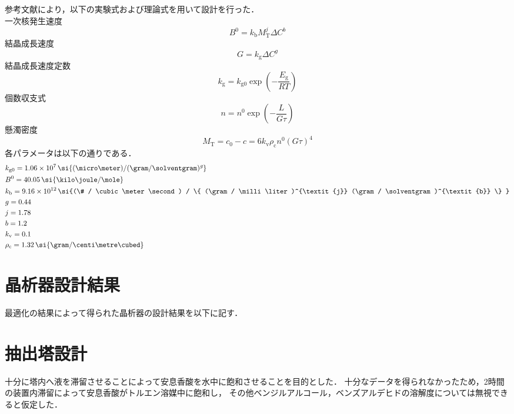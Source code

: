 参考文献\cite{晶析}により，以下の実験式および理論式を用いて設計を行った．\\
一次核発生速度
\begin{equation}
    B^0 = k_\mathrm{b} M_\mathrm{T}^j \Delta C^b
\end{equation}
結晶成長速度
\begin{equation}
    G = k_\mathrm{g}\Delta C^g
\end{equation}
結晶成長速度定数
\begin{equation}
    k_\mathrm{g} = k_\mathrm{g0} \exp \left( -\frac{E_\mathrm{g}}{RT} \right)
\end{equation}
個数収支式
\begin{equation}
    n=n^0 \exp \left( -\frac{L}{G\tau} \right)
\end{equation}
懸濁密度
\begin{equation}
    M_\mathrm{T} = c_0-c = 6k_\mathrm{v} \rho_\mathrm{c} n^0 (G\tau)^4
\end{equation}
各パラメータは以下の通りである．
\begin{align*}
    &k_\mathrm{g0} = 1.06\times10^7 \, \si{(\micro \meter)/(\gram / \solventgram)^{\textit{g}}} \\
    &B^{\mathrm{0}} = 40.05 \, \si{\kilo \joule / \mole} \\
    &k_\mathrm{b} = 9.16 \times 10^{12} \, \si{(\# / \cubic \meter \second) / \{ (\gram / \milli \liter)^{\textit{j}} (\gram / \solventgram)^{\textit{b}} \} } \\
    &g = 0.44 \\
    &j = 1.78 \\
    &b = 1.2 \\
    &k_\mathrm{v} = 0.1 \\
    &\rho_\mathrm{c} = 1.32 \, \si{\gram / \centi \metre \cubed}
\end{align*}

\section{晶析器設計結果}
最適化の結果によって得られた晶析器の設計結果を以下に記す．

\section{抽出塔設計}
十分に塔内へ液を滞留させることによって安息香酸を水中に飽和させることを目的とした．
十分なデータを得られなかったため，2時間の装置内滞留によって安息香酸がトルエン溶媒中に飽和し，
その他ベンジルアルコール，ベンズアルデヒドの溶解度については無視できると仮定した．

